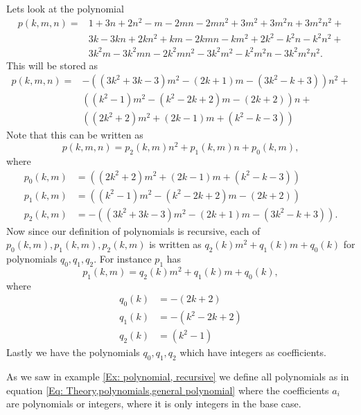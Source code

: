 \begin{example}\label{Ex: polynomial, recursive}
  Lets look at the polynomial
  \begin{equation*}
    \begin{split}
      p(k,m,n) = &1+3n+2n^2-m-2mn-2mn^2+3m^2+3m^2n+3m^2n^2+\\
      &3k-3kn+2kn^2+km-2kmn-km^2+2k^2-k^2n-k^2n^2+\\
      &3k^2m-3k^2mn-2k^2mn^2-3k^2m^2-k^2m^2n-3k^2m^2n^2.
    \end{split}
  \end{equation*}
  This will be stored as
  \begin{equation*}
    \begin{split}
      p(k,m,n) = & -((3k^2+3k-3)m^2-(2k+1)m-(3k^2-k+3))n^2+\\
      &((k^2-1)m^2-(k^2-2k+2)m-(2k+2))n+\\
      &((2k^2+2)m^2+(2k-1)m+(k^2-k-3))
    \end{split}
  \end{equation*}
  Note that this can be written as
  \begin{equation*}
    p(k,m,n) = p_2(k,m)n^2+p_1(k,m)n+p_0(k,m),
  \end{equation*}
  where
  \begin{equation*}
    \begin{split}
      p_0(k,m) &= ((2k^2+2)m^2+(2k-1)m+(k^2-k-3))\\
      p_1(k,m) &= ((k^2-1)m^2-(k^2-2k+2)m-(2k+2))\\
      p_2(k,m) &= -((3k^2+3k-3)m^2-(2k+1)m-(3k^2-k+3)).
    \end{split}
  \end{equation*}
  Now since our definition of polynomials is recursive, each of $p_0(k,m),p_1(k,m),p_2(k,m)$ is written as $q_2(k)m^2+q_1(k)m+q_0(k)$ for polynomials $q_0,q_1,q_2$. For instance $p_1$ has
  \begin{equation*}
    p_1(k,m) = q_2(k)m^2+q_1(k)m+q_0(k),
  \end{equation*}
  where
  \begin{equation*}
    \begin{split}
      q_0(k) & = -(2k+2) \\
      q_1(k) & = -(k^2-2k+2) \\
      q_2(k) & = (k^2-1)
    \end{split}
  \end{equation*}
  Lastly we have the polynomials $q_0,q_1,q_2$ which have integers as coefficients.
\end{example}
As we saw in example \ref{Ex: polynomial, recursive} we define all polynomials as in equation \ref{Eq: Theory,polynomials,general polynomial} where the coefficients $a_i$ are polynomials or integers, where it is only integers in the base case.

